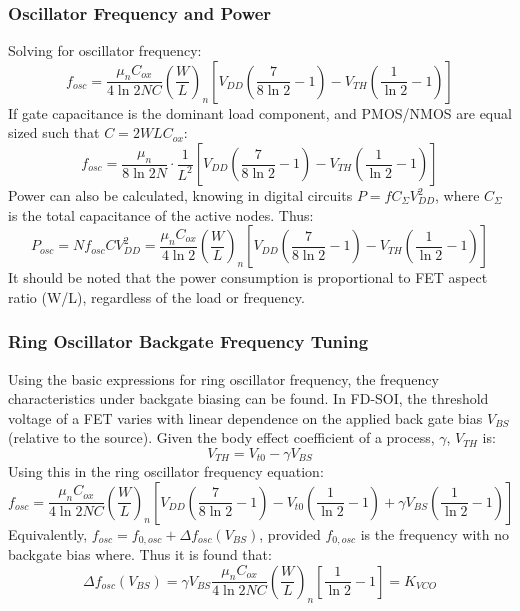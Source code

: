 		\subsubsection{Oscillator Frequency and Power}
			Solving for oscillator frequency:
			\begin{equation}\label{eq:osc_freq_w_l}
				f_{osc} = \frac{\mu_nC_{ox}}{4\ln2NC}\left(\frac{W}{L}\right)_n\left[V_{DD}\left(\frac{7}{8\ln2}-1\right)-V_{TH}\left(\frac{1}{\ln2}-1\right) \right]
			\end{equation}
			If gate capacitance is the dominant load component, and PMOS/NMOS are equal sized such that $C=2WLC_{ox}$:
			\begin{equation}
				f_{osc} = \frac{\mu_n}{8\ln2N}\cdot\frac{1}{L^2}\left[V_{DD}\left(\frac{7}{8\ln2}-1\right)-V_{TH}\left(\frac{1}{\ln2}-1\right) \right]
			\end{equation}
			Power can also be calculated, knowing in digital circuits $P = fC_{\Sigma}V_{DD}^2$, where $C_{\Sigma}$ is the total capacitance of the active nodes. Thus:
			\begin{equation}\label{eq:osc_pow_consumption}
				P_{osc} = Nf_{osc}CV_{DD}^2 = \frac{\mu_nC_{ox}}{4\ln2}\left(\frac{W}{L}\right)_n\left[V_{DD}\left(\frac{7}{8\ln2}-1\right)-V_{TH}\left(\frac{1}{\ln2}-1\right) \right]
			\end{equation}
			It should be noted that the power consumption is proportional to FET aspect ratio (W/L), regardless of the load or frequency.

	\subsubsection{Ring Oscillator Backgate Frequency Tuning}
		Using the basic expressions for ring oscillator frequency, the frequency characteristics under backgate biasing can be found. In FD-SOI, the threshold voltage of a FET varies with linear dependence on the applied back gate bias $V_{BS}$ (relative to the source). Given the body effect coefficient of a process, $\gamma$, $V_{TH}$ is:
		\begin{equation}
			V_{TH} = V_{t0} - \gamma V_{BS}
		\end{equation}
		Using this in the ring oscillator frequency equation:
		\begin{equation}
			f_{osc} = \frac{\mu_nC_{ox}}{4\ln2NC}\left(\frac{W}{L}\right)_n\left[V_{DD}\left(\frac{7}{8\ln2}-1\right)-V_{t0}\left(\frac{1}{\ln2}-1\right) + \gamma V_{BS}\left(\frac{1}{\ln2}-1\right) \right]
		\end{equation}
		Equivalently, $f_{osc} = f_{0,osc} + \Delta f_{osc}(V_{BS})$, provided $f_{0,osc}$ is the frequency with no backgate bias where. Thus it is found that:
		\begin{equation}\label{eq:kvco_}
			\Delta f_{osc}(V_{BS}) = \gamma V_{BS}\frac{\mu_nC_{ox}}{4\ln2NC}\left(\frac{W}{L}\right)_n\left[\frac{1}{\ln2}-1\right] = K_{VCO}
		\end{equation}	

